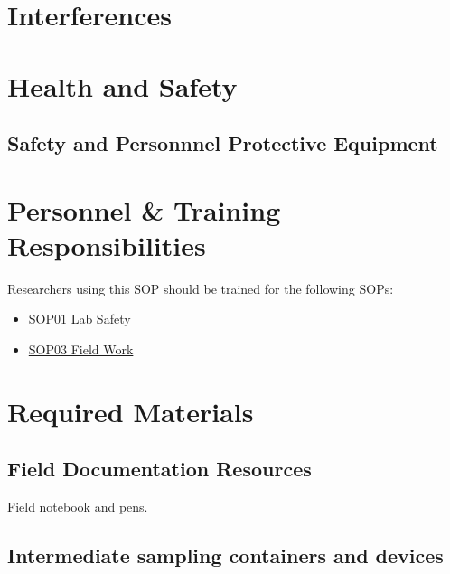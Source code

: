 \documentclass[12pt]{../SOP4_alpha}\usepackage[]{graphicx}\usepackage[]{xcolor}
\begin{document}
\section{Interferences}

\section{Health and Safety}

\subsection{Safety and Personnnel Protective Equipment}


\section{Personnel \& Training Responsibilities}

Researchers using this SOP should be trained for the following SOPs:

\begin{itemize}
  \item \href{https://github.com/marclos/SOPs/blob/master/01_Laboratory_Safety/Laboratory_Safety_v1.04.pdf}{SOP01 Lab Safety}
  \item \href{https://github.com/marclos/SOPs/blob/master/03_Field_Safety/Field_Safety_v1.1.pdf}{SOP03 Field Work}
\end{itemize}

\section{Required Materials}

\subsection{Field Documentation Resources}

\NP Field notebook and pens.  

\subsection{Intermediate sampling containers and devices}
\end{document}
